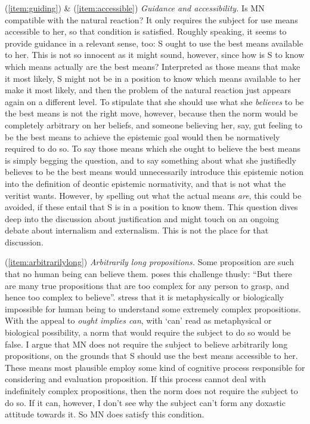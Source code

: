 \documentclass[12pt,numbers=noenddot]{scrartcl}
\begin{document}
(\ref{item:guiding}) \& (\ref{item:accessible}) \emph{Guidance and accessibility.}
 Is MN compatible with the natural reaction? It only requires the subject for use means accessible to her, so that condition is satisfied. Roughly speaking, it seems to provide guidance in a relevant sense, too: S ought to use the best means available to her. This is not so innocent as it might sound, however, since how is S to know which means actually are the best means? Interpreted as those means that make it most likely, S might not be in a position to know which means available to her make it most likely, and then the problem of the natural reaction just appears again on a different level. To stipulate that she should use what she \emph{believes} to be the best means is not the right move, however, because then the norm would be completely arbitrary on her beliefs, and someone believing her, say, gut feeling to be the best means to achieve the epistemic goal would then be normatively required to do so. To say those means which she ought to believe the best means is simply begging the question, and to say something about what she justifiedly believes to be the best means would unnecessarily introduce this epistemic notion into the definition of deontic epistemic normativity, and that is not what the veritist wants. However, by spelling out what the actual means \emph{are}, this could be avoided, if these entail that S is in a position to know them. This question dives deep into the discussion about justification and might touch on an ongoing debate about internalism and externalism. This is not the place for that discussion.

(\ref{item:arbitrarilylong}) \emph{Arbitrarily long propositions.} 
Some proposition are such that no human being can believe them. \textcite[12]{Mchugh2012-MCHTTN} poses this challenge thusly: “But there are many true propositions that are too complex for any person to grasp, and hence too complex to believe”. \textcite[279]{Bykvist2007-BYKDTI} stress that it is metaphysically or biologically impossible for human being to understand some extremely complex propositions. With the appeal to \emph{ought implies can}, with ‘can’ read as metaphysical or biological possibility, a norm that would require the subject to do so would be false. I argue that MN does not require the subject to believe arbitrarily long propositions, on the grounds that S should use the best means accessible to her. These means most plausible employ some kind of cognitive process responsible for considering and evaluation proposition. If this process cannot deal with indefinitely complex propositions, then the norm does not require the subject to do so. If it can, however, I don't see why the subject can't form any doxastic attitude towards it. So MN does satisfy this condition.
\end{document}
